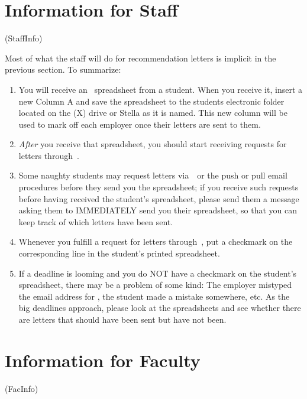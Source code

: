 \documentclass{\classes/econtex}
\begin{document}
\section{Information for Staff}\ifdvi\hypertarget{StaffInfo}{(StaffInfo)}\fi

Most of what the staff will do for recommendation letters is implicit in the previous section.  To
summarize:
\begin{enumerate}
\item You will receive an \EMtt~spreadsheet from a student.  When you receive it, insert a new Column A and save the spreadsheet to the students electronic folder located on the (X) drive or Stella as it is named. This new column will be used to mark off each employer once their letters are sent to them.
\item \textit{After} you receive that spreadsheet, you should start receiving requests for letters through~\jmstaffemail.  
\item Some naughty students may request letters via~\EJM~or the push or pull email procedures before they send you the spreadsheet; if you receive such requests before having received the student's spreadsheet, please send them a message asking them to IMMEDIATELY send you their spreadsheet, so that you can keep track of which letters have been sent.
\item Whenever you fulfill a request for letters through~\jmstaffemail, put a checkmark on the corresponding line in the student's printed spreadsheet.
\item If a deadline is looming and you do NOT have a checkmark on the student's spreadsheet, there may be a problem of some kind: The employer mistyped the email address for \jmstaffemail, the student made a mistake somewhere, etc.  As the big deadlines approach, please look at the spreadsheets and see whether there are letters that should have been sent but have not been.
\end{enumerate}

\section{Information for Faculty}\ifdvi\hypertarget{FacInfo}{(FacInfo)}\fi
\end{document}
